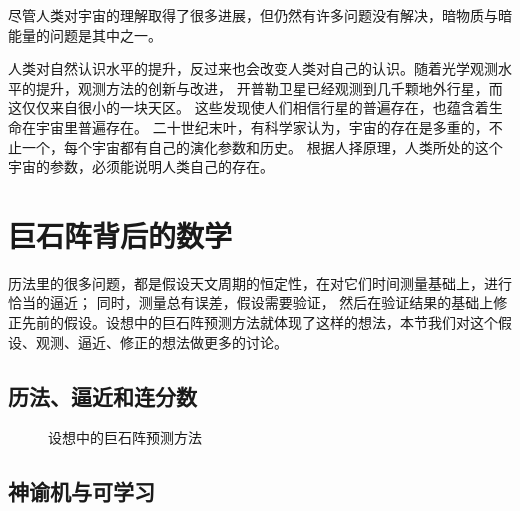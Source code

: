 \documentclass[a4paper,10.5pt]{book}
\begin{document}
尽管人类对宇宙的理解取得了很多进展，但仍然有许多问题没有解决，暗物质与暗能量的问题是其中之一。

人类对自然认识水平的提升，反过来也会改变人类对自己的认识。随着光学观测水平的提升，观测方法的创新与改进，
开普勒卫星已经观测到几千颗地外行星，而这仅仅来自很小的一块天区。
这些发现使人们相信行星的普遍存在，也蕴含着生命在宇宙里普遍存在。
二十世纪末叶，有科学家认为，宇宙的存在是多重的，不止一个，每个宇宙都有自己的演化参数和历史。
根据人择原理，人类所处的这个宇宙的参数，必须能说明人类自己的存在。


\section{巨石阵背后的数学}

历法里的很多问题，都是假设天文周期的恒定性，在对它们时间测量基础上，进行恰当的逼近； 同时，测量总有误差，假设需要验证，
然后在验证结果的基础上修正先前的假设。设想中的巨石阵预测方法就体现了这样的想法，本节我们对这个假设、观测、逼近、修正的想法做更多的讨论。

\subsection{历法、逼近和连分数}

\begin{figure}[ht]
\centering
{}
\caption{设想中的巨石阵预测方法}
\end{figure}



\subsection{神谕机与可学习}
\end{document}
